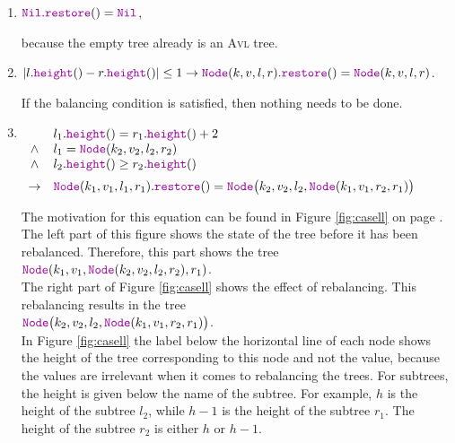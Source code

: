 \begin{enumerate}
\item $\mytt{Nil}.\mytt{restore}() = \mytt{Nil}$,

      because the empty tree already is an  \textsc{Avl} tree.
\item $|l.\mytt{height}() - r.\mytt{height}()| \leq 1 \rightarrow 
       \mytt{Node}(k,v,l,r).\mytt{restore}() = \mytt{Node}(k,v,l,r)$.

      If the balancing condition is satisfied, then nothing needs to be done. 
\item $\begin{array}[t]{cl}
              & l_1.\mytt{height}() = r_1.\mytt{height}() + 2    \\ 
       \wedge & l_1 = \mytt{Node}(k_2,v_2,l_2,r_2)                 \\
       \wedge & l_2.\mytt{height}() \geq r_2.\mytt{height}()     \\[0.2cm]
       \rightarrow & \mytt{Node}(k_1,v_1,l_1,r_1).\mytt{restore}() = 
                     \mytt{Node}\bigl(k_2,v_2,l_2,\mytt{Node}(k_1,v_1,r_2,r_1)\bigr)
       \end{array}
      $

      The motivation for this equation can be found in Figure \ref{fig:casell}
      on page \pageref{fig:casell}.  The left part of this figure shows the state
      of the tree before it has been rebalanced.  Therefore, this part shows the tree
      \\[0.2cm]
      \hspace*{1.3cm}
      $\mytt{Node}(k_1,v_1, \mytt{Node}(k_2,v_2,l_2,r_2), r_1)$. 
      \\[0.2cm]
      The right part of Figure \ref{fig:casell} shows the effect of rebalancing.  
      This rebalancing results in the tree
      \\[0.2cm]
      \hspace*{1.3cm}
      $\mytt{Node}\bigl(k_2,v_2,l_2,\mytt{Node}(k_1,v_1,r_2,r_1)\bigr)$.
      \\[0.2cm]
      In Figure \ref{fig:casell} the label below the horizontal line of each node shows the height
      of the tree corresponding to this node and not the value, because the values are irrelevant when it comes
      to rebalancing the trees.  For subtrees, the height is given below the name of
      the subtree.  For example,  $h$ is the height of the subtree 
      $l_2$, while $h-1$ is the height of the subtree $r_1$. The height of the subtree $r_2$
      is either $h$ or $h-1$.


\end{enumerate}
